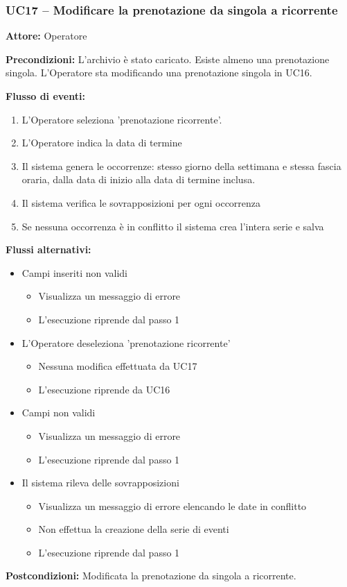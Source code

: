 \documentclass[a4paper,11pt]{article}
\begin{document}
\begin{samepage}
\subsubsection*{UC17 -- Modificare la prenotazione da singola a ricorrente}
\begin{ucbox}

\noindent\textbf{Attore:} Operatore\par
\noindent\textbf{Precondizioni:} L'archivio è stato caricato. Esiste almeno una prenotazione singola. L'Operatore sta modificando una prenotazione singola in UC16.\par

\noindent\textbf{Flusso di eventi:}
\begin{enumerate}
\item L'Operatore seleziona 'prenotazione ricorrente'. \item L'Operatore indica la data di termine \item Il sistema genera le occorrenze: stesso giorno della settimana e stessa fascia oraria, dalla data di inizio alla data di termine inclusa. \item Il sistema verifica le sovrapposizioni per ogni occorrenza \item Se nessuna occorrenza è in conflitto il sistema crea l'intera serie e salva \end{enumerate}
\noindent\textbf{Flussi alternativi:}
\begin{itemize}
\item[1a.] Campi inseriti non validi
\begin{itemize}
\item Visualizza un messaggio di errore
\item L'esecuzione riprende dal passo 1
\end{itemize}
\item[1b.] L'Operatore deseleziona 'prenotazione ricorrente'
\begin{itemize}
\item Nessuna modifica effettuata da UC17
\item L'esecuzione riprende da UC16
\end{itemize}
\item[2a.] Campi non validi
\begin{itemize}
\item Visualizza un messaggio di errore
\item L'esecuzione riprende dal passo 1
\end{itemize}
\item[4a.] Il sistema rileva delle sovrapposizioni
\begin{itemize}
\item Visualizza un messaggio di errore elencando le date in conflitto
\item Non effettua la creazione della serie di eventi
\item L'esecuzione riprende dal passo 1
\end{itemize}
\end{itemize}
\noindent\textbf{Postcondizioni:} Modificata la prenotazione da singola a ricorrente.\par
\end{ucbox}
\end{samepage}
\end{document}
